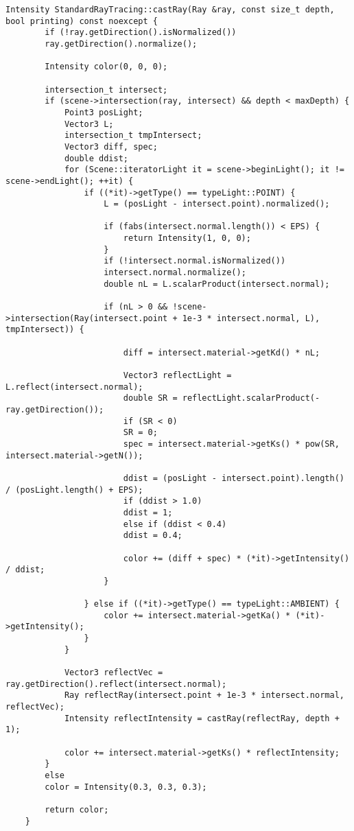 \begin{center}
	\captionsetup{justification=raggedright,singlelinecheck=off}
	\renewcommand{\lstlistingname}{Листинг}
	\begin{lstlisting}[label=lst:castRay, caption=Реализация алгоритма определения цвета пикселя]
	Intensity StandardRayTracing::castRay(Ray &ray, const size_t depth, bool printing) const noexcept {
		if (!ray.getDirection().isNormalized())
		ray.getDirection().normalize();
		
		Intensity color(0, 0, 0);
		
		intersection_t intersect;
		if (scene->intersection(ray, intersect) && depth < maxDepth) {
			Point3 posLight;  
			Vector3 L;          
			intersection_t tmpIntersect;
			Vector3 diff, spec;
			double ddist;
			for (Scene::iteratorLight it = scene->beginLight(); it != scene->endLight(); ++it) {
				if ((*it)->getType() == typeLight::POINT) {
					L = (posLight - intersect.point).normalized();  
					
					if (fabs(intersect.normal.length()) < EPS) {
						return Intensity(1, 0, 0);
					}
					if (!intersect.normal.isNormalized())
					intersect.normal.normalize();
					double nL = L.scalarProduct(intersect.normal);  
					
					if (nL > 0 && !scene->intersection(Ray(intersect.point + 1e-3 * intersect.normal, L), tmpIntersect)) {
						
						diff = intersect.material->getKd() * nL;
						
						Vector3 reflectLight = L.reflect(intersect.normal);
						double SR = reflectLight.scalarProduct(-ray.getDirection());
						if (SR < 0)
						SR = 0;
						spec = intersect.material->getKs() * pow(SR, intersect.material->getN());
						
						ddist = (posLight - intersect.point).length() / (posLight.length() + EPS);
						if (ddist > 1.0)
						ddist = 1;
						else if (ddist < 0.4)
						ddist = 0.4;
						
						color += (diff + spec) * (*it)->getIntensity() / ddist;  
					}
					
				} else if ((*it)->getType() == typeLight::AMBIENT) {
					color += intersect.material->getKa() * (*it)->getIntensity();
				}
			}
			
			Vector3 reflectVec = ray.getDirection().reflect(intersect.normal);
			Ray reflectRay(intersect.point + 1e-3 * intersect.normal, reflectVec);
			Intensity reflectIntensity = castRay(reflectRay, depth + 1);

			color += intersect.material->getKs() * reflectIntensity;
		}
		else 
		color = Intensity(0.3, 0.3, 0.3);
		
		return color;
	}
	\end{lstlisting}
\end{center}
\clearpage


